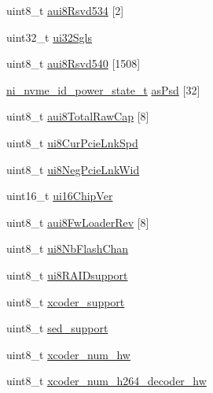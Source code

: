 \begin{DoxyCompactItemize}
\item 
uint8\+\_\+t \mbox{\hyperlink{struct__ni__nvme__identify_a2d98976d5d41a1518a837c4769e1f92d}{aui8\+Rsvd534}} \mbox{[}2\mbox{]}
\item 
uint32\+\_\+t \mbox{\hyperlink{struct__ni__nvme__identify_a3ee2c69cebcf52d2d7aa3e72beda2ed4}{ui32\+Sgls}}
\item 
uint8\+\_\+t \mbox{\hyperlink{struct__ni__nvme__identify_a31d3545e6a8eea55597396b2cff11638}{aui8\+Rsvd540}} \mbox{[}1508\mbox{]}
\item 
\mbox{\hyperlink{ni__nvme_8h_a1a1a76137cfb375acef1331f45fb31e3}{ni\+\_\+nvme\+\_\+id\+\_\+power\+\_\+state\+\_\+t}} \mbox{\hyperlink{struct__ni__nvme__identify_a2a961bf31e58fec101465ba0034a7756}{as\+Psd}} \mbox{[}32\mbox{]}
\item 
uint8\+\_\+t \mbox{\hyperlink{struct__ni__nvme__identify_aa286046019b93f5be69e76572e361330}{aui8\+Total\+Raw\+Cap}} \mbox{[}8\mbox{]}
\item 
uint8\+\_\+t \mbox{\hyperlink{struct__ni__nvme__identify_aafe781e089f62e94a4d866f38a0bb200}{ui8\+Cur\+Pcie\+Lnk\+Spd}}
\item 
uint8\+\_\+t \mbox{\hyperlink{struct__ni__nvme__identify_a4c47700c3dd99573dfdc56c3832e3a8e}{ui8\+Neg\+Pcie\+Lnk\+Wid}}
\item 
uint16\+\_\+t \mbox{\hyperlink{struct__ni__nvme__identify_a691a35e1cb9bd6fc07561967981e0e72}{ui16\+Chip\+Ver}}
\item 
uint8\+\_\+t \mbox{\hyperlink{struct__ni__nvme__identify_a4f9cc9817bba80a8b73065079e09ad46}{aui8\+Fw\+Loader\+Rev}} \mbox{[}8\mbox{]}
\item 
uint8\+\_\+t \mbox{\hyperlink{struct__ni__nvme__identify_a5c73f62cc2f3455c8996d6f2f7ddd9d0}{ui8\+Nb\+Flash\+Chan}}
\item 
uint8\+\_\+t \mbox{\hyperlink{struct__ni__nvme__identify_ac2562f2ce49a47ae9f36ced08b493f42}{ui8\+R\+A\+I\+Dsupport}}
\item 
uint8\+\_\+t \mbox{\hyperlink{struct__ni__nvme__identify_a3d94a371cc34463cb981c3457b871468}{xcoder\+\_\+support}}
\item 
uint8\+\_\+t \mbox{\hyperlink{struct__ni__nvme__identify_a93f0b4ba85a8ab60c50d7dd8cc7fbec8}{sed\+\_\+support}}
\item 
uint8\+\_\+t \mbox{\hyperlink{struct__ni__nvme__identify_ab1cecc0c28a705ebb24032f2dc731733}{xcoder\+\_\+num\+\_\+hw}}
\item 
uint8\+\_\+t \mbox{\hyperlink{struct__ni__nvme__identify_a0bce72c6f2bfe0330620aa64010fa977}{xcoder\+\_\+num\+\_\+h264\+\_\+decoder\+\_\+hw}}

\end{DoxyCompactItemize}
